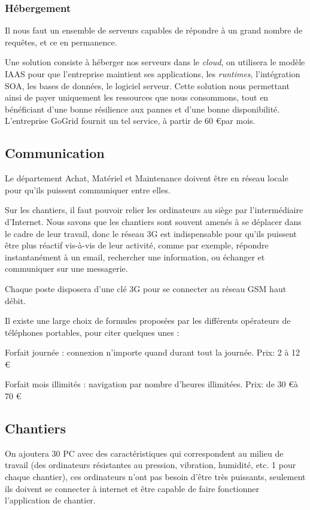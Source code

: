 \documentclass[a4paper]{article}
\begin{document}
	\subsubsection{Hébergement}
    Il nous faut un ensemble de serveurs capables de répondre à un grand
    nombre de requêtes, et ce en permanence.

Une solution consiste à héberger nos serveurs dans le \textsl{cloud}, on
utilisera le modèle IAAS pour  que l'entreprise maintient ses applications,
les {\sl runtimes}, l'intégration SOA, les bases de données, le logiciel
serveur.  Cette solution nous permettant ainsi de payer uniquement les
ressources que nous consommons, tout en bénéficiant d'une bonne résilience
aux pannes et d'une bonne disponibilité.  L'entreprise GoGrid fournit un
tel service, à partir de 60 \euro par mois.


\subsection{Communication}
Le département Achat, Matériel et Maintenance doivent être en réseau locale
pour qu'ils puissent  communiquer entre elles.

Sur les chantiers, il faut pouvoir relier les ordinateurs au siège par
l'intermédiaire d'Internet.  Nous savons que les chantiers sont souvent
amenés à se déplacer dans le cadre de leur travail, donc le réseau 3G est
indispensable pour qu'ils puissent être plus réactif vis-à-vis de leur
activité, comme par exemple, répondre instantanément à un email, rechercher
une information, ou échanger et communiquer sur une messagerie. 

Chaque poste disposera d’une clé 3G pour se connecter au réseau GSM haut
débit.

Il existe une large choix de formules proposées par les différents
opérateurs de téléphones portables, pour citer quelques unes :

Forfait journée : connexion n'importe quand durant tout la journée. Prix: 2 à
12 \euro

Forfait mois illimités : navigation par nombre d'heures illimitées.  Prix:
de 30 \euro à 70 \euro


\subsection{Chantiers}
On ajoutera 30 PC avec des caractéristiques qui correspondent au milieu de
travail (des ordinateurs résistantes au pression, vibration, humidité, etc.
1 pour chaque chantier), ces ordinateurs n'ont pas besoin d’être très
puissants, seulement ils doivent se connecter à internet et être capable de
faire fonctionner l'application de chantier.
\end{document}
